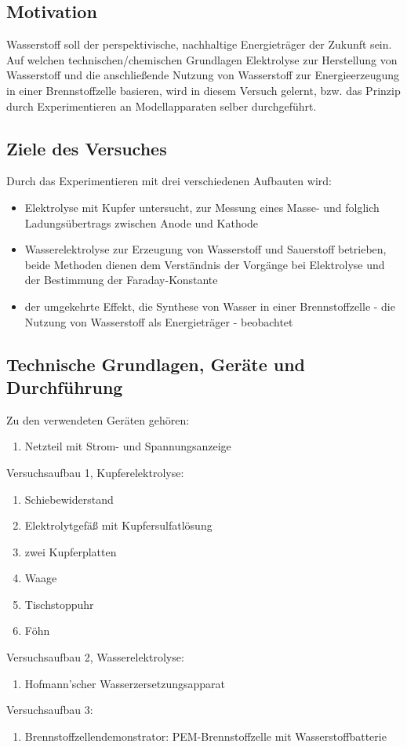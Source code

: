 \subsection{Motivation}
Wasserstoff soll der perspektivische, nachhaltige Energieträger der Zukunft sein. Auf welchen technischen/chemischen Grundlagen Elektrolyse zur Herstellung von Wasserstoff und die anschließende Nutzung von Wasserstoff zur Energieerzeugung in einer Brennstoffzelle basieren, wird in diesem Versuch gelernt, bzw. das Prinzip durch Experimentieren an Modellapparaten selber durchgeführt.   
\subsection{Ziele des Versuches}
Durch das Experimentieren mit drei verschiedenen Aufbauten wird:
\begin{itemize}
    \item Elektrolyse mit Kupfer untersucht, zur Messung eines Masse- und folglich Ladungsübertrags zwischen Anode und Kathode
    \item Wasserelektrolyse zur Erzeugung von Wasserstoff und Sauerstoff betrieben, beide Methoden dienen dem Verständnis der Vorgänge bei Elektrolyse und der Bestimmung der Faraday-Konstante
    \item der umgekehrte Effekt, die Synthese von Wasser in einer Brennstoffzelle - die Nutzung von Wasserstoff als Energieträger - beobachtet   
\end{itemize}

\subsection{Technische Grundlagen, Geräte und Durchführung}
Zu den verwendeten Geräten gehören:
\begin{enumerate}
    \item Netzteil mit Strom- und Spannungsanzeige
\end{enumerate}
Versuchsaufbau 1, Kupferelektrolyse:
\begin{enumerate}[resume]
    \item Schiebewiderstand
    \item Elektrolytgefäß mit Kupfersulfatlösung    
    \item zwei Kupferplatten
    \item Waage
    \item Tischstoppuhr
    \item Föhn
\end{enumerate}
Versuchsaufbau 2, Wasserelektrolyse:
\begin{enumerate}[resume]
    \item Hofmann'scher Wasserzersetzungsapparat
\end{enumerate}
Versuchsaufbau 3: 
\begin{enumerate}[resume]
    \item Brennstoffzellendemonstrator: PEM-Brennstoffzelle mit Wasserstoffbatterie 
\end{enumerate}

